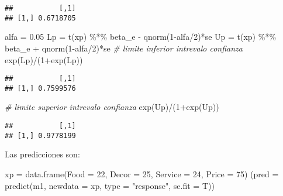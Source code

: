 \documentclass[
]{article}
\newenvironment{Shaded}{\begin{snugshade}}{\end{snugshade}}
\newcommand{\AttributeTok}[1]{\textcolor[rgb]{0.77,0.63,0.00}{#1}}
\newcommand{\CommentTok}[1]{\textcolor[rgb]{0.56,0.35,0.01}{\textit{#1}}}
\newcommand{\DecValTok}[1]{\textcolor[rgb]{0.00,0.00,0.81}{#1}}
\newcommand{\FloatTok}[1]{\textcolor[rgb]{0.00,0.00,0.81}{#1}}
\newcommand{\FunctionTok}[1]{\textcolor[rgb]{0.00,0.00,0.00}{#1}}
\newcommand{\NormalTok}[1]{#1}
\newcommand{\OtherTok}[1]{\textcolor[rgb]{0.56,0.35,0.01}{#1}}
\newcommand{\SpecialCharTok}[1]{\textcolor[rgb]{0.00,0.00,0.00}{#1}}
\newcommand{\StringTok}[1]{\textcolor[rgb]{0.31,0.60,0.02}{#1}}
\begin{document}
\begin{verbatim}
##           [,1]
## [1,] 0.6718705
\end{verbatim}

\begin{Shaded}
\begin{Highlighting}[]
\NormalTok{alfa }\OtherTok{=} \FloatTok{0.05}
\NormalTok{Lp }\OtherTok{=} \FunctionTok{t}\NormalTok{(xp) }\SpecialCharTok{\%*\%}\NormalTok{ beta\_e }\SpecialCharTok{{-}} \FunctionTok{qnorm}\NormalTok{(}\DecValTok{1}\SpecialCharTok{{-}}\NormalTok{alfa}\SpecialCharTok{/}\DecValTok{2}\NormalTok{)}\SpecialCharTok{*}\NormalTok{se}
\NormalTok{Up }\OtherTok{=} \FunctionTok{t}\NormalTok{(xp) }\SpecialCharTok{\%*\%}\NormalTok{ beta\_e }\SpecialCharTok{+} \FunctionTok{qnorm}\NormalTok{(}\DecValTok{1}\SpecialCharTok{{-}}\NormalTok{alfa}\SpecialCharTok{/}\DecValTok{2}\NormalTok{)}\SpecialCharTok{*}\NormalTok{se}
\CommentTok{\# limite inferior intrevalo confianza}
\FunctionTok{exp}\NormalTok{(Lp)}\SpecialCharTok{/}\NormalTok{(}\DecValTok{1}\SpecialCharTok{+}\FunctionTok{exp}\NormalTok{(Lp))}
\end{Highlighting}
\end{Shaded}

\begin{verbatim}
##           [,1]
## [1,] 0.7599576
\end{verbatim}

\begin{Shaded}
\begin{Highlighting}[]
\CommentTok{\# limite superior intrevalo confianza}
\FunctionTok{exp}\NormalTok{(Up)}\SpecialCharTok{/}\NormalTok{(}\DecValTok{1}\SpecialCharTok{+}\FunctionTok{exp}\NormalTok{(Up))}
\end{Highlighting}
\end{Shaded}

\begin{verbatim}
##           [,1]
## [1,] 0.9778199
\end{verbatim}

Las predicciones son:

\begin{Shaded}
\begin{Highlighting}[]
\NormalTok{xp }\OtherTok{=} \FunctionTok{data.frame}\NormalTok{(}\AttributeTok{Food =} \DecValTok{22}\NormalTok{, }\AttributeTok{Decor =} \DecValTok{25}\NormalTok{, }\AttributeTok{Service =} \DecValTok{24}\NormalTok{, }\AttributeTok{Price =} \DecValTok{75}\NormalTok{)}
\NormalTok{(}\AttributeTok{pred =} \FunctionTok{predict}\NormalTok{(m1, }\AttributeTok{newdata =}\NormalTok{ xp, }\AttributeTok{type =} \StringTok{"response"}\NormalTok{, }\AttributeTok{se.fit =}\NormalTok{ T))}
\end{Highlighting}
\end{Shaded}
\end{document}
